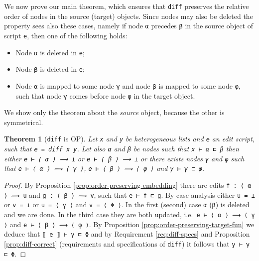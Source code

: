 \documentclass[preprint]{sigplanconf}
\theoremstyle{plain}
\newtheorem{thm}{Theorem}
\begin{document}
We now prove our main theorem, which ensures that
\texttt{diff} preserves the relative order of nodes in the
source (target) objects.
%
Since nodes may also be deleted the property sees also these cases,
namely if node \texttt{α} precedes \texttt{β} in the source object of
script \texttt{e}, then one of the following holds:
    \begin{itemize}
    \item Node \texttt{α} is deleted in \texttt{e};
    \item Node \texttt{β} is deleted in \texttt{e};
    \item Node \texttt{α} is mapped to some node \texttt{γ} and node
      \texttt{β} is mapped to some node \texttt{φ}, such that node
      \texttt{γ} comes before node \texttt{φ} in the target object.
    \end{itemize}
%
    We show only the theorem about the \emph{source} object, because
    the other is symmetrical.
\begin{thm}[\texttt{diff} is OP]
  Let \texttt{x} and \texttt{y} be heterogeneous lists and \texttt{e}
  an edit script, such that \texttt{e = diff x y}. Let also \texttt{α}
  and \texttt{β} be nodes such that \texttt{x ⊢ α ⊏ β} then either
  \texttt{e ⊢ ⟨ α ⟩ ⟿ ⊥} or \texttt{e ⊢ ⟨ β ⟩ ⟿ ⊥} or there exists nodes
  \texttt{γ} and \texttt{φ} such that \texttt{e ⊢ ⟨ α ⟩ ⟿ ⟨ γ ⟩},
  \texttt{e ⊢ ⟨ β ⟩ ⟿ ⟨ φ ⟩} and \texttt{y ⊢ γ ⊏ φ}.
\end{thm}
\begin{proof}
  By Proposition \ref{prop:order-preserving-embedding} there are edits
  \texttt{f : ⟨ α ⟩ ⟿ u} and \texttt{g : ⟨ β ⟩ ⟿ v}, such that
  \texttt{e ⊢ f ⊏ g}.
  By case analysis either \texttt{u = ⊥} or \texttt{v = ⊥} or \texttt{u = ⟨ γ ⟩}
  and \texttt{v = ⟨ Φ ⟩}. In the first (second) case \texttt{α} (\texttt{β}) is deleted and we are done.
  In the third case they are both updated, i.e.\ \texttt{e ⊢ ⟨ α ⟩ ⟿ ⟨ γ ⟩} and
  \texttt{e ⊢ ⟨ β ⟩ ⟿ ⟨ φ ⟩}.
  By Proposition \ref{prop:order-preserving-target-fun} we deduce that
  \texttt{⟦ e ⟧ ⊢ γ ⊏ Φ} and by Requirement \ref{req:diff-specs} and
  Proposition \ref{prop:diff-correct} (requirements and specifications
  of \texttt{diff}) it follows that \texttt{y ⊢ γ ⊏ Φ}.
\end{proof}
\end{document}
